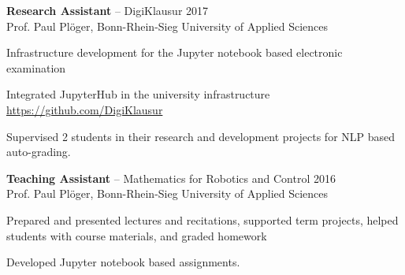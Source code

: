 \documentclass{article}
\newcommand{\employer}[4]{{
\vspace*{2pt}%
\textbf{#1} #2 \hfill #3\\ #4 \vspace*{2pt}}
}
\renewcommand{\labelitemii}{
$\vcenter{\hbox{\tiny$\bullet$}}$\hspace*{-3pt}
}
\newenvironment{bullet-list-minor}{
\begin{list}{\labelitemii}{\setlength\leftmargin{15pt} 
\topsep 0pt \itemsep -2pt}}{\vspace*{4pt}\end{list}
}
\begin{document}
    \employer{Research Assistant}{-- DigiKlausur}{2017}
    {Prof. Paul Pl\"{o}ger, Bonn-Rhein-Sieg University of Applied Sciences}
    \begin{bullet-list-minor}
    \item Infrastructure development for the Jupyter notebook based electronic examination
    \item Integrated JupyterHub in the university infrastructure \url{https://github.com/DigiKlausur}
    \item Supervised 2 students in their research and development projects for NLP based auto-grading.
    \end{bullet-list-minor}

    \employer{Teaching Assistant}{-- Mathematics for Robotics and Control}{2016}
    {Prof. Paul Pl\"{o}ger, Bonn-Rhein-Sieg University of Applied Sciences}
    \begin{bullet-list-minor}
    \item  Prepared  and  presented  lectures  and  recitations,  supported  term  projects,  helped  students  with  course  materials, and graded homework
    \item Developed Jupyter notebook based assignments.
    \end{bullet-list-minor}
\end{document}

